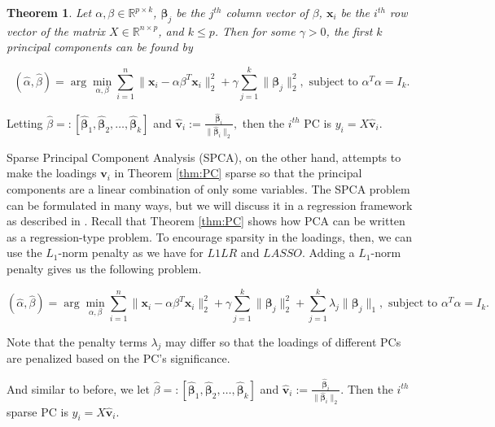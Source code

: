\documentclass{article}
\newtheorem{Theorem}{Theorem}
\begin{document}
\begin{Theorem}\label{thm:PC}
Let $\alpha, \beta \in \mathbb{R}^{p \times k}$, $\boldsymbol{\beta}_j$ be the $j^{th}$ column vector of $\beta$,  $\boldsymbol{x}_i$ be the $i^{th}$ row vector of the matrix $X\in \mathbb{R}^{n\times p}$, and $k \leq p$. Then for some $\gamma>0$, the first $k$ principal components can be found by
\end{Theorem}
$$(\hat{\alpha}, \hat{\beta}) = \arg \min_{\alpha, \beta} \sum_{i=1}^n \|\boldsymbol{x}_i-\alpha\beta^T\boldsymbol{x}_i\|_2^2 + \gamma \sum_{j=1}^k \|\boldsymbol{\beta}_j\|_2^2,\text{ subject to }\alpha^T\alpha=I_k.$$

Letting $\hat{\beta}=:[\boldsymbol{\hat{\beta}}_1, \boldsymbol{\hat{\beta}}_2, \ldots, \boldsymbol{\hat{\beta}}_k]$ and $\boldsymbol{\hat{v}}_i := \frac{\boldsymbol{\hat{\beta}}_i}{\|\boldsymbol{\hat{\beta}}_i\|_2},$ then the $i^{th}$ PC is $y_i=X\boldsymbol{\hat{v}}_i$.

Sparse Principal Component Analysis (SPCA), on the other hand, attempts to make the loadings $\boldsymbol{v}_i$ in Theorem \eqref{thm:PC} sparse so that the principal components are a linear combination of only some variables. The SPCA problem can be formulated in many ways, but we will discuss it in a regression framework as described in \cite{spca_reference}. Recall that Theorem \eqref{thm:PC} shows how PCA can be written as a regression-type problem. To encourage sparsity in the loadings, then, we can use the $L_1$-norm penalty as we have for $L1LR$ and $LASSO$. Adding a $L_1$-norm penalty gives us the following problem.

\begin{equation}\label{eq:spca}
(\hat{\alpha}, \hat{\beta}) = \arg \min_{\alpha, \beta} \sum_{i=1}^n \|\boldsymbol{x}_i-\alpha\beta^T\boldsymbol{x}_i\|_2^2 + \gamma \sum_{j=1}^k \|\boldsymbol{\beta}_j\|_2^2+\sum_{j=1}^k \lambda_j\|\boldsymbol{\beta}_j\|_1,\text{ subject to }\alpha^T\alpha=I_k.
\end{equation}

Note that the penalty terms $\lambda_j$ may differ so that the loadings of different PCs are penalized based on the PC's significance.

And similar to before, we let $\hat{\beta}=:[\boldsymbol{\hat{\beta}}_1, \boldsymbol{\hat{\beta}}_2, \ldots, \boldsymbol{\hat{\beta}}_k]$ and $\boldsymbol{\hat{v}}_i := \frac{\boldsymbol{\hat{\beta}}_i}{\|\boldsymbol{\hat{\beta}}_i\|_2}.$ Then the $i^{th}$ sparse PC is $y_i=X\boldsymbol{\hat{v}}_i$.
\end{document}
